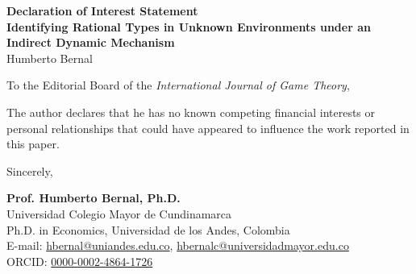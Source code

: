\documentclass[12pt]{article}
\begin{document}
\singlespacing

\begin{center}
\textbf{Declaration of Interest Statement} \\
\vspace{1em}
\textbf{Identifying Rational Types in Unknown Environments under an Indirect Dynamic Mechanism} \\
Humberto Bernal
\end{center}

\vspace{3em}

\noindent To the Editorial Board of the \textit{International Journal of Game Theory},

\vspace{2em}

\noindent The author declares that he has no known competing financial interests or personal relationships that could have appeared to influence the work reported in this paper.

\vspace{4em}

\begin{flushleft}
Sincerely,

\vspace{3em}

\textbf{Prof. Humberto Bernal, Ph.D.} \\
Universidad Colegio Mayor de Cundinamarca \\
Ph.D. in Economics, Universidad de los Andes, Colombia \\
E-mail: \href{mailto:hbernal@uniandes.edu.co}{hbernal@uniandes.edu.co}, \href{mailto:hbernalc@universidadmayor.edu.co}{hbernalc@universidadmayor.edu.co} \\
ORCID: \href{https://orcid.org/0000-0002-4864-1726}{0000-0002-4864-1726}
\end{flushleft}
\end{document}
